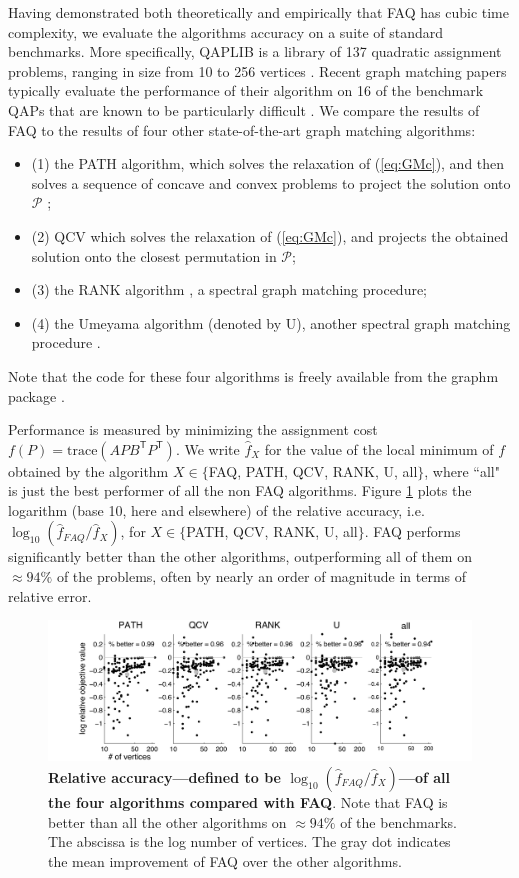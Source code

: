 \documentclass[10pt]{article}
\providecommand{\mc}[1]{\mathcal{#1}}
\providecommand{\mh}[1]{\hat{#1}}
\providecommand{\mc}[1]{\mathcal{#1}}
\providecommand{\mh}[1]{\hat{#1}}
\newcommand{\T}{^{\ensuremath{\mathsf{T}}}}
\begin{document}
Having demonstrated both theoretically and empirically that FAQ has cubic time complexity, we evaluate the algorithms accuracy on a suite of standard benchmarks.  More specifically, QAPLIB is a library of 137 quadratic assignment problems, ranging in size from 10 to 256 vertices \cite{Burkard1997}.  Recent graph matching papers typically evaluate the performance of their algorithm on 16 of the benchmark QAPs that are known to be particularly difficult \cite{Zaslavskiy2009,Schellewald2001}.  We compare the results of FAQ to the results of four other state-of-the-art graph matching algorithms: 
\begin{itemize}
\item[](1) the PATH algorithm, which solves the relaxation of (\ref{eq:GMc}), and then solves a sequence of concave and convex problems to project the solution onto $\mc{P}$ \cite{Zaslavskiy2009};
\item[](2) QCV which solves the relaxation of (\ref{eq:GMc}), and projects the obtained solution onto the closest permutation in $\mc{P}$;
\item[](3) the RANK algorithm \cite{Singh2007}, a spectral graph matching procedure;
\item[](4) the Umeyama algorithm (denoted by U), another spectral graph matching procedure \cite{Umeyama1988}.
\end{itemize}
  Note that the code for these four algorithms is freely available from the graphm package \cite{Zaslavskiy2009}.  

Performance is measured by minimizing the assignment cost $f(P)=\text{trace}(APB\T P\T)$.  We write $\mh{f}_X$ for the value of the local minimum of $f$ obtained by the algorithm $X \in \{$FAQ, PATH, QCV, RANK, U, all$\}$, where ``all" is just the best performer of all the non FAQ algorithms.
Figure \ref{fig:allRelAccuracy} plots the logarithm (base 10, here and elsewhere) of the relative accuracy, i.e. $\log_{10}(\mh{f}_{FAQ}/\mh{f}_X)$, for $X \in \{$PATH, QCV, RANK, U, all$\}$.  FAQ performs significantly better than the other algorithms, outperforming all of them on $\approx 94\%$ of the problems, often by nearly an order of magnitude in terms of relative error.

\begin{figure}[htbp]
	\centering
		\includegraphics[width=1.0\linewidth]{Figure2.pdf}
	\caption{{\bf Relative accuracy---defined to be $\log_{10}(\mh{f}_{FAQ}/\mh{f}_X)$---of all the four algorithms compared with FAQ}.  Note that FAQ is better than all the other algorithms on $\approx 94\%$ of the benchmarks. The abscissa is the log number of vertices.  The gray dot indicates the mean improvement of FAQ over the other algorithms.}
	\label{fig:allRelAccuracy}
\end{figure}
\end{document}
